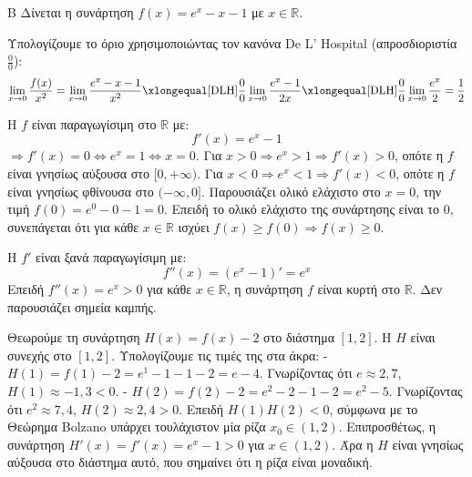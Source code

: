 
\begin{thema}{Β}
Δίνεται η συνάρτηση $f(x) = e^x - x - 1$ με $x \in \mathbb{R}$.
\begin{erwthma}
\item Υπολογίζουμε το όριο χρησιμοποιώντας τον κανόνα De L' Hospital (απροσδιοριστία $\frac{0}{0}$):
\[ \lim_{x\to0} \frac{f(x)}{x^2} = \lim_{x\to0} \frac{e^x - x - 1}{x^2} \xlongequal[\text{DLH}]{\frac{0}{0}} \lim_{x\to0} \frac{e^x - 1}{2x} \xlongequal[\text{DLH}]{\frac{0}{0}} \lim_{x\to0} \frac{e^x}{2} = \frac{1}{2} \]

\item Η $f$ είναι παραγωγίσιμη στο $\mathbb{R}$ με:
\[ f'(x) = e^x - 1 \]
$\Rightarrow f'(x) = 0 \Leftrightarrow e^x = 1 \Leftrightarrow x = 0$.
Για $x > 0 \Rightarrow e^x > 1 \Rightarrow f'(x) > 0$, οπότε η $f$ είναι γνησίως αύξουσα στο $[0, +\infty)$.
Για $x < 0 \Rightarrow e^x < 1 \Rightarrow f'(x) < 0$, οπότε η $f$ είναι γνησίως φθίνουσα στο $(-\infty, 0]$.
Παρουσιάζει ολικό ελάχιστο στο $x=0$, την τιμή $f(0) = e^0 - 0 - 1 = 0$.
Επειδή το ολικό ελάχιστο της συνάρτησης είναι το 0, συνεπάγεται ότι για κάθε $x \in \mathbb{R}$ ισχύει $f(x) \ge f(0) \Rightarrow f(x) \ge 0$.

\item Η $f'$ είναι ξανά παραγωγίσιμη με:
\[ f''(x) = (e^x - 1)' = e^x \]
Επειδή $f''(x) = e^x > 0$ για κάθε $x \in \mathbb{R}$, η συνάρτηση $f$ είναι κυρτή στο $\mathbb{R}$. Δεν παρουσιάζει σημεία καμπής.

\item Θεωρούμε τη συνάρτηση $H(x) = f(x) - 2$ στο διάστημα $[1, 2]$.
Η $H$ είναι συνεχής στο $[1, 2]$.
Υπολογίζουμε τις τιμές της στα άκρα:
- $H(1) = f(1) - 2 = e^1 - 1 - 1 - 2 = e - 4$. Γνωρίζοντας ότι $e \approx 2,7$, $H(1) \approx -1,3 < 0$.
- $H(2) = f(2) - 2 = e^2 - 2 - 1 - 2 = e^2 - 5$. Γνωρίζοντας ότι $e^2 \approx 7,4$, $H(2) \approx 2,4 > 0$.
Επειδή $H(1)H(2) < 0$, σύμφωνα με το Θεώρημα Bolzano υπάρχει τουλάχιστον μία ρίζα $x_0 \in (1, 2)$.
Επιπροσθέτως, η συνάρτηση $H'(x) = f'(x) = e^x - 1 > 0$ για $x \in (1, 2)$. Άρα η $H$ είναι γνησίως αύξουσα στο διάστημα αυτό, που σημαίνει ότι η ρίζα είναι μοναδική.
\end{erwthma}
\end{thema}

